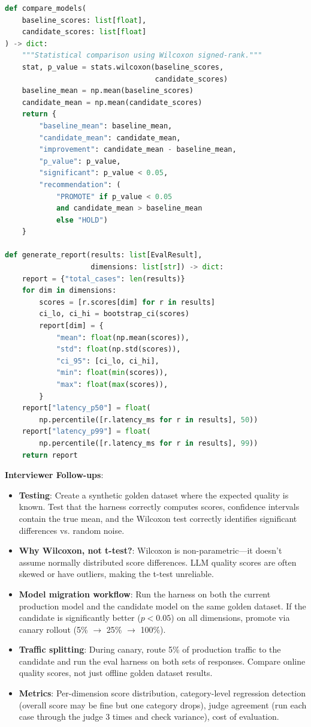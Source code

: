 \begin{lstlisting}[language=Python]
def compare_models(
    baseline_scores: list[float],
    candidate_scores: list[float]
) -> dict:
    """Statistical comparison using Wilcoxon signed-rank."""
    stat, p_value = stats.wilcoxon(baseline_scores,
                                   candidate_scores)
    baseline_mean = np.mean(baseline_scores)
    candidate_mean = np.mean(candidate_scores)
    return {
        "baseline_mean": baseline_mean,
        "candidate_mean": candidate_mean,
        "improvement": candidate_mean - baseline_mean,
        "p_value": p_value,
        "significant": p_value < 0.05,
        "recommendation": (
            "PROMOTE" if p_value < 0.05
            and candidate_mean > baseline_mean
            else "HOLD")
    }

def generate_report(results: list[EvalResult],
                    dimensions: list[str]) -> dict:
    report = {"total_cases": len(results)}
    for dim in dimensions:
        scores = [r.scores[dim] for r in results]
        ci_lo, ci_hi = bootstrap_ci(scores)
        report[dim] = {
            "mean": float(np.mean(scores)),
            "std": float(np.std(scores)),
            "ci_95": [ci_lo, ci_hi],
            "min": float(min(scores)),
            "max": float(max(scores)),
        }
    report["latency_p50"] = float(
        np.percentile([r.latency_ms for r in results], 50))
    report["latency_p99"] = float(
        np.percentile([r.latency_ms for r in results], 99))
    return report
\end{lstlisting}

\textbf{Interviewer Follow-ups}:
\begin{itemize}[leftmargin=*]
    \item \textbf{Testing}: Create a synthetic golden dataset where the expected quality is known. Test that the harness correctly computes scores, confidence intervals contain the true mean, and the Wilcoxon test correctly identifies significant differences vs. random noise.
    \item \textbf{Why Wilcoxon, not t-test?}: Wilcoxon is non-parametric---it doesn't assume normally distributed score differences. LLM quality scores are often skewed or have outliers, making the t-test unreliable.
    \item \textbf{Model migration workflow}: Run the harness on both the current production model and the candidate model on the same golden dataset. If the candidate is significantly better ($p < 0.05$) on all dimensions, promote via canary rollout (5\% $\to$ 25\% $\to$ 100\%).
    \item \textbf{Traffic splitting}: During canary, route 5\% of production traffic to the candidate and run the eval harness on both sets of responses. Compare online quality scores, not just offline golden dataset results.
    \item \textbf{Metrics}: Per-dimension score distribution, category-level regression detection (overall score may be fine but one category drops), judge agreement (run each case through the judge 3 times and check variance), cost of evaluation.
\end{itemize}

